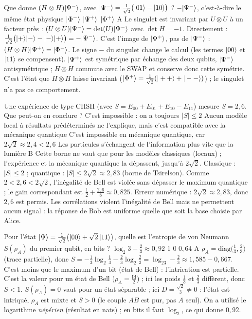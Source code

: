   {Que donne $(H\otimes H)|\Psi^-\rangle$, avec $|\Psi^-\rangle=\frac{1}{\sqrt2}\big(|01\rangle-|10\rangle\big)$ ?}
  {$-|\Psi^-\rangle$, c'est-à-dire le même état physique}
  {$|\Phi^-\rangle$}
  {$|\Psi^+\rangle$}
  {$|\Phi^+\rangle$}
  {A}
\qcmx
  {Le singulet est invariant par $U\otimes U$ à un facteur près : $(U\otimes U)|\Psi^-\rangle=\det(U)|\Psi^-\rangle$ avec $\det H=-1$. Directement : $\frac{1}{\sqrt2}\big(|+\rangle|-\rangle-|-\rangle|+\rangle\big)=-|\Psi^-\rangle$.}
  {C'est l'image de $|\Psi^+\rangle$, pas de $|\Psi^-\rangle$ : $(H\otimes H)|\Psi^+\rangle=|\Phi^-\rangle$. Le signe $-$ du singulet change le calcul (les termes $|00\rangle$ et $|11\rangle$ se compensent).}
  {$|\Psi^+\rangle$ est symétrique par échange des deux qubits, $|\Psi^-\rangle$ antisymétrique ; $H\otimes H$ commute avec le SWAP et conserve donc cette symétrie.}
  {C'est l'état que $H\otimes H$ laisse invariant ($|\Phi^+\rangle=\frac{1}{\sqrt2}(|++\rangle+|--\rangle)$) ; le singulet n'a pas ce comportement.}

  {Une expérience de type CHSH (avec $S=E_{00}+E_{01}+E_{10}-E_{11}$) mesure $S=2{,}6$. Que peut-on en conclure ?}
  {C'est impossible : on a toujours $|S|\leq2$}
  {Aucun modèle local à résultats prédéterminés ne l'explique, mais c'est compatible avec la mécanique quantique}
  {C'est impossible en mécanique quantique, car $2\sqrt2\approx2{,}4<2{,}6$}
  {Les particules s'échangent de l'information plus vite que la lumière}
  {B}
\qcmx
  {Cette borne ne vaut que pour les modèles classiques (locaux) ; l'expérience et la mécanique quantique la dépassent, jusqu'à $2\sqrt2$.}
  {Classique : $|S|\leq2$ ; quantique : $|S|\leq2\sqrt2\approx2{,}83$ (borne de Tsirelson). Comme $2<2{,}6<2\sqrt2$, l'inégalité de Bell est violée sans dépasser le maximum quantique ; le gain correspondant est $\frac12+\frac{2{,}6}{8}\approx0{,}825$.}
  {Erreur numérique : $2\sqrt2\approx2{,}83$, donc $2{,}6$ est permis.}
  {Les corrélations violent l'inégalité de Bell mais ne permettent aucun signal : la réponse de Bob est uniforme quelle que soit la base choisie par Alice.}

  {Pour l'état $|\Psi\rangle=\frac{1}{\sqrt3}\big(|00\rangle+\sqrt2\,|11\rangle\big)$, quelle est l'entropie de von Neumann $S(\rho_A)$ du premier qubit, en bits ?}
  {$\log_2 3-\frac23\approx0{,}92$}
  {$1$}
  {$0$}
  {$0{,}64$}
  {A}
\qcmx
  {$\rho_A=\mathrm{diag}\big(\frac13,\frac23\big)$ (trace partielle), donc $S=-\frac13\log_2\frac13-\frac23\log_2\frac23=\log_23-\frac23\approx1{,}585-0{,}667$. C'est moins que le maximum d'un bit (état de Bell) : l'intrication est partielle.}
  {C'est la valeur pour un état de Bell ($\rho_A=\frac{\mathrm{Id}}{2}$) ; ici les poids $\frac13$ et $\frac23$ diffèrent, donc $S<1$.}
  {$S(\rho_A)=0$ vaut pour un état séparable ; ici $D=\frac{\sqrt2}{3}\neq0$ : l'état est intriqué, $\rho_A$ est mixte et $S>0$ (le couple $AB$ est pur, pas $A$ seul).}
  {On a utilisé le logarithme \emph{népérien} (résultat en nats) ; en bits il faut $\log_2$, ce qui donne $0{,}92$.}

